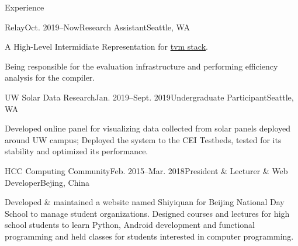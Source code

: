 \documentclass{resume}
\begin{document}
	\begin{rSection}{Experience}



		\begin{rSubsection}{Relay}{Oct. 2019--Now}{Research Assistant}{Seattle, WA}
			\item A High-Level Intermidiate Representation for \href{https://tvm.ai/}{tvm stack}.
			\item Being responsible for the evaluation infrastructure and performing efficiency analysis for the compiler.
		\end{rSubsection}
		\vspace{-5pt}


		\begin{rSubsection}{UW Solar Data Research}{Jan. 2019--Sept. 2019}{Undergraduate Participant}{Seattle, WA}
			\item Developed online panel for visualizing data collected from solar panels deployed around UW campus; Deployed the system to the CEI Testbeds, tested for its stability and optimized its performance.
		\end{rSubsection}
		\vspace{-5pt}


		\begin{rSubsection}{HCC Computing Community}{Feb. 2015--Mar. 2018}{President \& Lecturer \& Web Developer}{Bejing, China}
			\item Developed \& maintained a website named Shiyiquan for Beijing National Day School to manage student organizations. Designed courses and lectures for high school students to learn Python, Android development and functional programming and held classes for students interested in computer programming.
		\end{rSubsection}
		\vspace{-5pt}
	\end{rSection}
	\vspace{-5pt}
\end{document}
